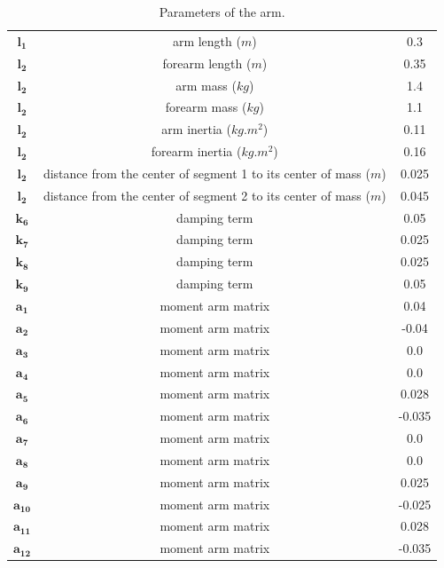 \documentclass[pdftex,a4paper,11pt]{article}
\begin{document}
\begin{table}[hbt]
\caption{Parameters of the arm.}
\begin{center}
\begin{tabular}{|c|c|c|}
\hline  
$\textbf{l}_{\textbf{1}}$ & arm length ($m$) & 0.3\\
$\textbf{l}_{\textbf{2}}$ & forearm length ($m$) & 0.35\\
$\textbf{l}_{\textbf{2}}$ & arm mass ($kg$) & 1.4\\
$\textbf{l}_{\textbf{2}}$ & forearm mass ($kg$) & 1.1\\
$\textbf{l}_{\textbf{2}}$ & arm inertia ($kg.m^2$) & 0.11\\
$\textbf{l}_{\textbf{2}}$ & forearm inertia ($kg.m^2$) & 0.16\\
$\textbf{l}_{\textbf{2}}$ & distance from the center of segment 1 to its center of mass ($m$) & 0.025\\
$\textbf{l}_{\textbf{2}}$ & distance from the center of segment 2 to its center of mass ($m$) & 0.045\\
$\textbf{k}_{\textbf{6}}$ & damping term & 0.05\\
$\textbf{k}_{\textbf{7}}$ & damping term & 0.025\\
$\textbf{k}_{\textbf{8}}$ & damping term & 0.025\\
$\textbf{k}_{\textbf{9}}$ & damping term & 0.05\\
$\textbf{a}_{\textbf{1}}$ & moment arm matrix & 0.04\\
$\textbf{a}_{\textbf{2}}$ & moment arm matrix & -0.04\\
$\textbf{a}_{\textbf{3}}$ & moment arm matrix & 0.0\\
$\textbf{a}_{\textbf{4}}$ & moment arm matrix & 0.0\\
$\textbf{a}_{\textbf{5}}$ & moment arm matrix & 0.028\\
$\textbf{a}_{\textbf{6}}$ & moment arm matrix & -0.035\\
$\textbf{a}_{\textbf{7}}$ & moment arm matrix & 0.0\\
$\textbf{a}_{\textbf{8}}$ & moment arm matrix & 0.0\\
$\textbf{a}_{\textbf{9}}$ & moment arm matrix & 0.025\\
$\textbf{a}_{\textbf{10}}$ & moment arm matrix & -0.025\\
$\textbf{a}_{\textbf{11}}$ & moment arm matrix & 0.028\\
$\textbf{a}_{\textbf{12}}$ & moment arm matrix & -0.035\\
\hline
\end{tabular}
\end{center}
\label{arm_model_params}
\end{table}
\end{document}
